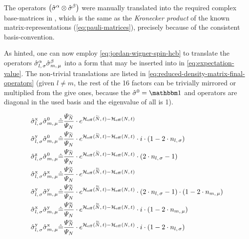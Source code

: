 The operators $\left(\pauli[]{$\alpha$}\otimes\pauli[]{$\beta$}\right)$ were manually translated into the required complex base-matrices in 
, which is the same as the \emph{Kronecker product} \cite{kroneckerProduct} of the known matrix-representations (\autoref{eq:pauli-matrices}), precisely because of the consistent basis-convention.

As hinted, one can now employ \autoref{eq:jordan-wigner-spin-hcb} to translate the operators $\pauli[l,\,\sigma]{$\alpha$}\pauli[m,\,\mu]{$\beta$}$ into a form that may be inserted into  in \autoref{eq:expectation-value}. The non-trivial translations are listed in \autoref{eq:reduced-density-matrix-final-operators} (given $l\neq m$, the rest of the 16 factors can be trivially mirrored or multiplied from the give ones, because the $\pauli[]{0} = \one[]$ and  operators are diagonal in the used basis and the eigenvalue of all \one[] is 1).

\begin{equation}
    \label{eq:reduced-density-matrix-final-operators}
    \begin{split}
        \pauli[l,\,\sigma]{x} \pauli[m,\,\mu]{0}  &\hat{=}
        \frac{\psiN[\vphantom{N}\smash{\tilde{N}}]}{\psiN}        \cdot         e^{\HeffOft[\vphantom{N}\smash{\tilde{N}}]-\HeffOft[N]}
        \\
        \pauli[l,\,\sigma]{y} \pauli[m,\,\mu]{0}  &\hat{=}
        \frac{\psiN[\vphantom{N}\smash{\tilde{N}}]}{\psiN}        \cdot         e^{\HeffOft[\vphantom{N}\smash{\tilde{N}}]-\HeffOft[N]} \cdot i \cdot (1-2 \cdot n_{l,\,\sigma}) 
        \\
        \pauli[l,\,\sigma]{z} \pauli[m,\,\mu]{0}  &\hat{=}
        \frac{\psiN[\vphantom{N}\smash{\tilde{N}}]}{\psiN}        \cdot         e^{\HeffOft[\vphantom{N}\smash{\tilde{N}}]-\HeffOft[N]} \cdot (2 \cdot n_{l,\,\sigma} - 1) 
        \\
        \pauli[l,\,\sigma]{x} \pauli[m,\,\mu]{x}  &\hat{=}
        \frac{\psiN[\vphantom{N}\smash{\tildetilde{N}}]}{\psiN}        \cdot         e^{\HeffOft[\vphantom{N}\smash{\tildetilde{N}}]-\HeffOft[N]}
        \\
        \pauli[l,\,\sigma]{y} \pauli[m,\,\mu]{y}  &\hat{=}
        \frac{\psiN[\vphantom{N}\smash{\tildetilde{N}}]}{\psiN}        \cdot         e^{\HeffOft[\vphantom{N}\smash{\tildetilde{N}}]-\HeffOft[N]} \cdot (2 \cdot n_{l,\,\sigma} - 1) \cdot (1- 2 \cdot n_{m,\,\mu})
        \\
        \pauli[l,\,\sigma]{x} \pauli[m,\,\mu]{y}  &\hat{=}
        \frac{\psiN[\vphantom{N}\smash{\tildetilde{N}}]}{\psiN}        \cdot         e^{\HeffOft[\vphantom{N}\smash{\tildetilde{N}}]-\HeffOft[N]} \cdot i \cdot (1-2 \cdot n_{m,\,\mu}) 
        \\
        \pauli[l,\,\sigma]{y} \pauli[m,\,\mu]{x}  &\hat{=}
        \frac{\psiN[\vphantom{N}\smash{\tildetilde{N}}]}{\psiN}        \cdot         e^{\HeffOft[\vphantom{N}\smash{\tildetilde{N}}]-\HeffOft[N]} \cdot i \cdot (1-2 \cdot n_{l,\,\sigma}) 
    \end{split}
\end{equation}

